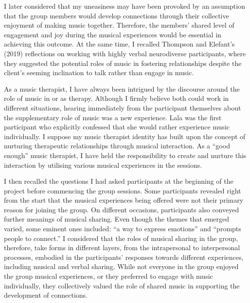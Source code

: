 \documentclass[authordate, empirical, issue]{jote-new-article}
\begin{document}
I later considered that my uneasiness may have been provoked by an assumption that the group members would develop connections through their collective enjoyment of making music together. Therefore, the members' shared level of engagement and joy during the musical experiences would be essential in achieving this outcome. At the same time, I recalled Thompson and Elefant's (2019) reflections on working with highly verbal neurodiverse participants, where they suggested the potential roles of music in fostering relationships despite the client's seeming inclination to talk rather than engage in music.



As a music therapist, I have always been intrigued by the discourse around the role of music in or as therapy. Although I firmly believe both could work in different situations, hearing immediately from the participant themselves about the supplementary role of music was a new experience. Lala was the first participant who explicitly confessed that she would rather experience music individually. I suppose my music therapist identity has built upon the concept of nurturing therapeutic relationships through musical interaction. As a “good enough” music therapist, I have held the responsibility to create and nurture this interaction by utilising various musical experiences in the sessions.



I then recalled the questions I had asked participants at the beginning of the project before commencing the group sessions. Some participants revealed right from the start that the musical experiences being offered were not their primary reason for joining the group. On different occasions, participants also conveyed further meanings of musical sharing. Even though the themes that emerged varied, some eminent ones included: “a way to express emotions” and “prompts people to connect.” I considered that the roles of musical sharing in the group, therefore, take forms in different layers, from the intrapersonal to interpersonal processes, embodied in the participants' responses towards different experiences, including musical and verbal sharing. While not everyone in the group enjoyed the group musical experiences, or they preferred to engage with music individually, they collectively valued the role of shared music in supporting the development of connections.
\end{document}
